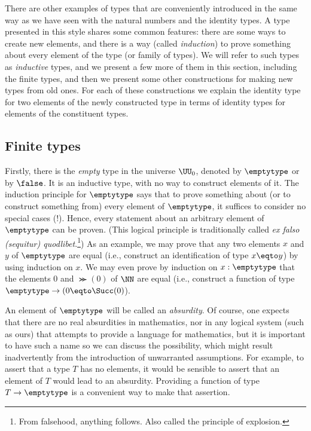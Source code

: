 There are other examples of types that are conveniently introduced
in the same way as we have seen with the natural numbers and the identity types.
A type
presented in this style shares some common features: there are some ways to create new elements, and there is a way (called \emph{induction}) to
prove something about every element of the type (or family of types).  We will refer to such types as \emph{inductive} types, and we present a
few more of them in this section, including the finite types, and then we present some other constructions for making new types from old ones.
For each of these constructions we explain the identity type for two
elements of the newly constructed type in terms of identity types for
elements of the constituent types.

\subsection{Finite types}
\label{sec:finite-types}
Firstly, there is the \emph{empty} type in the universe $\UU_0$, denoted by $\emptytype$ or by $\false$.  It is an inductive type, with no way
to construct elements of it.  The induction principle for $\emptytype$ says that to prove something about (or to construct something from) every
element of $\emptytype$, it suffices to consider no special cases (!).
Hence, every statement about an arbitrary element of $\emptytype$ can be
proven. (This logical principle is traditionally called
\emph{ex falso (sequitur) quodlibet}.\footnote{%
From falsehood, anything follows. Also called the principle of explosion.})
As an example, we may prove that any two elements $x$ and $y$ of
$\emptytype$ are equal (i.e., construct an identification of
type $x\eqto y$) by using induction on $x$. We may even
prove by induction on $x:\emptytype$ that the elements
$0$ and $\Succ(0)$ of $\NN$ are equal
(i.e., construct a function of type $\emptytype\to(0\eqto\Succ(0)$).

An element of $\emptytype$ will be called an \emph{absurdity}.  Of course, one expects that there are no real absurdities in mathematics, nor in any
logical system (such as ours) that attempts to provide a language for mathematics, but it is important to have such a name so we can discuss
the possibility, which might result inadvertently from the introduction of unwarranted assumptions.  For example, to assert that a type $T$ has
no elements, it would be sensible to assert that an element of $T$ would lead to an absurdity.  Providing a function of type $T \to \emptytype$ is a
convenient way to make that assertion.

